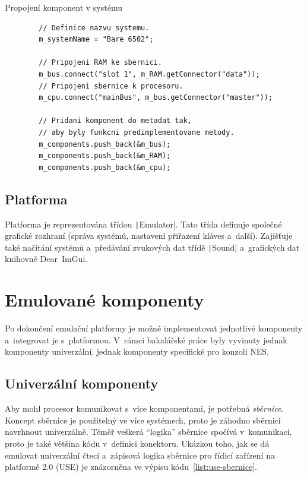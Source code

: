 \begin{listing}
	\caption{Propojení komponent v systému}
	\label{list:use-propojeni}
	\begin{verbatim}
		// Definice nazvu systemu.
		m_systemName = "Bare 6502";
		
		// Pripojeni RAM ke sbernici.
		m_bus.connect("slot 1", m_RAM.getConnector("data"));
		// Pripojeni sbernice k procesoru.
		m_cpu.connect("mainBus", m_bus.getConnector("master"));
		
		// Pridani komponent do metadat tak, 
		// aby byly funkcni predimplementovane metody.
		m_components.push_back(&m_bus);
		m_components.push_back(&m_RAM);
		m_components.push_back(&m_cpu);
	\end{verbatim}
\end{listing}

\subsection{Platforma}
Platforma je reprezentována třídou \texttt|Emulator|. Tato třída definuje společné grafické rozhraní (správa systémů, nastavení přiřazení kláves a~další). Zajišťuje také načítání systémů a~předávání zvukových dat třídě \texttt|Sound| a~grafických dat knihovně Dear~ImGui.

\section{Emulované komponenty}
Po dokončení emulační platformy je možné implementovat jednotlivé komponenty a~integrovat je s~platformou. V~rámci bakalářské práce byly vyvinuty jednak komponenty univerzální, jednak komponenty specifické pro konzoli NES.

\subsection{Univerzální komponenty}
Aby mohl procesor komunikovat s~více komponentami, je potřebná \emph{sběrnice}. Koncept sběrnice je použitelný ve více systémech, proto je záhodno sběrnici navrhnout univerzálně. Téměř veškerá \enquote{logika} sběrnice spočívá v~komunikaci, proto je také většina kódu v~definici konektoru. Ukázkou toho, jak se dá emulovat univerzální čtecí a~zápisová logika sběrnice pro řídicí zařízení na platformě 2.0 (USE) je znázorněna ve výpisu kódu~\ref{list:use-sbernice}.

